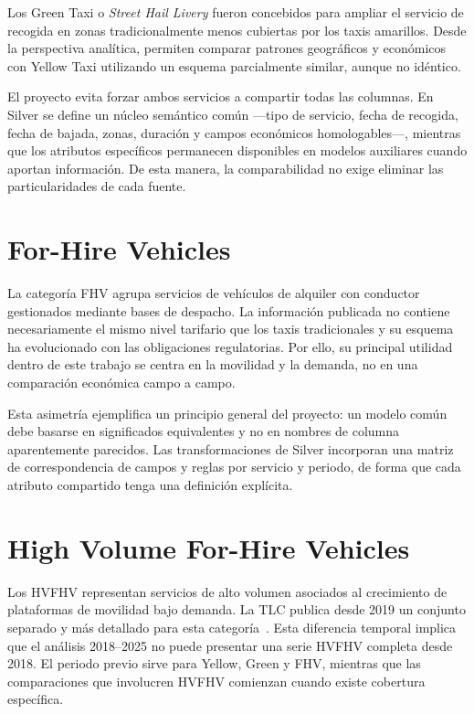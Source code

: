 Los Green Taxi o \textit{Street Hail Livery} fueron concebidos para ampliar el servicio de recogida en zonas tradicionalmente menos cubiertas por los taxis amarillos. Desde la perspectiva analítica, permiten comparar patrones geográficos y económicos con Yellow Taxi utilizando un esquema parcialmente similar, aunque no idéntico.

El proyecto evita forzar ambos servicios a compartir todas las columnas. En Silver se define un núcleo semántico común ---tipo de servicio, fecha de recogida, fecha de bajada, zonas, duración y campos económicos homologables---, mientras que los atributos específicos permanecen disponibles en modelos auxiliares cuando aportan información. De esta manera, la comparabilidad no exige eliminar las particularidades de cada fuente.

\section{For-Hire Vehicles}

La categoría FHV agrupa servicios de vehículos de alquiler con conductor gestionados mediante bases de despacho. La información publicada no contiene necesariamente el mismo nivel tarifario que los taxis tradicionales y su esquema ha evolucionado con las obligaciones regulatorias. Por ello, su principal utilidad dentro de este trabajo se centra en la movilidad y la demanda, no en una comparación económica campo a campo.

Esta asimetría ejemplifica un principio general del proyecto: un modelo común debe basarse en significados equivalentes y no en nombres de columna aparentemente parecidos. Las transformaciones de Silver incorporan una matriz de correspondencia de campos y reglas por servicio y periodo, de forma que cada atributo compartido tenga una definición explícita.

\section{High Volume For-Hire Vehicles}

Los HVFHV representan servicios de alto volumen asociados al crecimiento de plataformas de movilidad bajo demanda. La TLC publica desde 2019 un conjunto separado y más detallado para esta categoría~\cite{nyctlc_tripdata}. Esta diferencia temporal implica que el análisis 2018--2025 no puede presentar una serie HVFHV completa desde 2018. El periodo previo sirve para Yellow, Green y FHV, mientras que las comparaciones que involucren HVFHV comienzan cuando existe cobertura específica.

